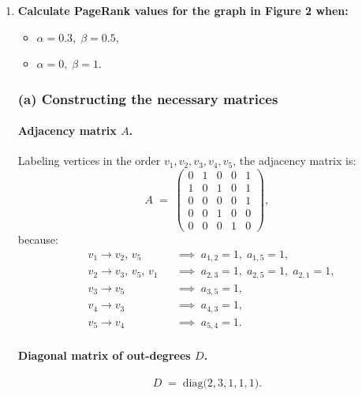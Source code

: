 \documentclass[a4paper,12pt]{article}
\begin{document}
\begin{enumerate}
\item \textbf{Calculate PageRank values for the graph in Figure 2 when:}
\begin{itemize}
\item $\alpha = 0.3,\;\beta = 0.5,$
\item $\alpha = 0,\;\beta = 1.$
\end{itemize}

\subsubsection*{(a) Constructing the necessary matrices}

\paragraph{Adjacency matrix $A$.}
Labeling vertices in the order $v_1,v_2,v_3,v_4,v_5$, the adjacency matrix is:
\[
A \;=\;
\begin{pmatrix}
0 & 1 & 0 & 0 & 1\\
1 & 0 & 1 & 0 & 1\\
0 & 0 & 0 & 0 & 1\\
0 & 0 & 1 & 0 & 0\\
0 & 0 & 0 & 1 & 0
\end{pmatrix},
\]
because:
\[
\begin{aligned}
&v_1 \to v_2,\,v_5 &&\implies \; a_{1,2}=1,\;a_{1,5}=1,\\
&v_2 \to v_3,\,v_5,\,v_1 &&\implies \; a_{2,3}=1,\;a_{2,5}=1,\;a_{2,1}=1,\\
&v_3 \to v_5 &&\implies \; a_{3,5}=1,\\
&v_4 \to v_3 &&\implies \; a_{4,3}=1,\\
&v_5 \to v_4 &&\implies \; a_{5,4}=1.
\end{aligned}
\]

\paragraph{Diagonal matrix of out-degrees $D$.}
\[
D 
\;=\;
\mathrm{diag}\bigl(2,3,1,1,1\bigr).
\]


\end{enumerate}
\end{document}

